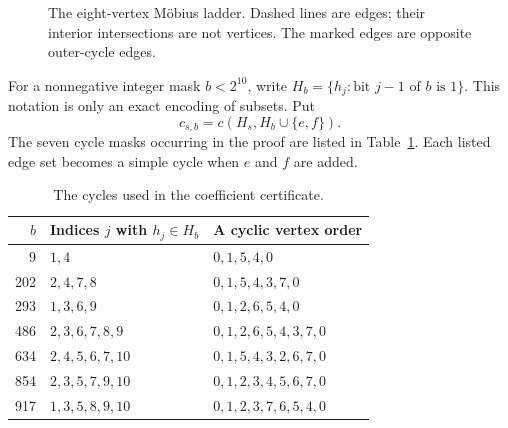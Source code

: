 \documentclass[11pt,a4paper]{article}
\begin{document}
\begin{figure}[ht]
\centering
{}
\caption{The eight-vertex M\"obius ladder. Dashed lines are edges;
their interior intersections are not vertices. The marked edges
are opposite outer-cycle edges.}\label{fig:graph}
\end{figure}

For a nonnegative integer mask $b<2^{10}$, write
$H_b=\{h_j:\text{bit }j-1\text{ of }b\text{ is }1\}$.
This notation is only an exact encoding of subsets. Put
\[
 c_{s,b}=c(H_s,H_b\cup\{e,f\}).
\]
The seven cycle masks occurring in the proof are listed in
Table~\ref{tab:cycles}. Each listed edge set becomes a simple cycle
when $e$ and $f$ are added.

\begin{table}[ht]
\centering
\begin{tabular}{rll}
\toprule
$b$ & Indices $j$ with $h_j\in H_b$ & A cyclic vertex order \\
\midrule
9   & $1,4$             & $0,1,5,4,0$\\
202 & $2,4,7,8$         & $0,1,5,4,3,7,0$\\
293 & $1,3,6,9$         & $0,1,2,6,5,4,0$\\
486 & $2,3,6,7,8,9$     & $0,1,2,6,5,4,3,7,0$\\
634 & $2,4,5,6,7,10$    & $0,1,5,4,3,2,6,7,0$\\
854 & $2,3,5,7,9,10$    & $0,1,2,3,4,5,6,7,0$\\
917 & $1,3,5,8,9,10$    & $0,1,2,3,7,6,5,4,0$\\
\bottomrule
\end{tabular}
\caption{The cycles used in the coefficient certificate.}\label{tab:cycles}
\end{table}
\end{document}
